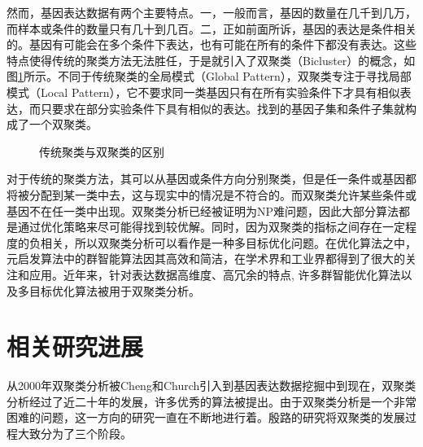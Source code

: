     然而，基因表达数据有两个主要特点。一，一般而言，基因的数量在几千到几万，而样本或条件的数量只有几十到几百。二，正如前面所诉，基因的表达是条件相关的。基因有可能会在多个条件下表达，也有可能在所有的条件下都没有表达。这些特点使得传统的聚类方法无法胜任，于是就引入了双聚类（Bicluster）的概念，如图\ref{fig:tradiAndBi}所示。不同于传统聚类的全局模式（Global Pattern），双聚类专注于寻找局部模式（Local Pattern），它不要求同一类基因只有在所有实验条件下才具有相似表达，而只要求在部分实验条件下具有相似的表达。找到的基因子集和条件子集就构成了一个双聚类。

    \begin{figure}[htbp]
    \setlength{\subfigcapskip}{-1bp}
    \centering
    \begin{minipage}{.9\textwidth}
    \centering
    \subfigure{}\addtocounter{subfigure}{-2}
    \subfigure{\subfigure[基因方向的传统聚类]{\texttt{[image: 1]}}}
    \hspace{.1em}
    \subfigure{}\addtocounter{subfigure}{-2}
    \subfigure{\subfigure[条件方向的传统聚类]{\texttt{[image: 2]}}}
    \hspace{.1em}
    \subfigure{}\addtocounter{subfigure}{-2}
    \subfigure{\subfigure[双聚类]{\texttt{[image: 3]}}}
    \end{minipage}
    \vspace{0.2em}
    \caption{传统聚类与双聚类的区别}
    \label{fig:tradiAndBi}
    \end{figure}
    对于传统的聚类方法，其可以从基因或条件方向分别聚类，但是任一条件或基因都将被分配到某一类中去，这与现实中的情况是不符合的。而双聚类允许某些条件或基因不在任一类中出现。双聚类分析已经被证明为NP难问题，因此大部分算法都是通过优化策略来尽可能得找到较优解。同时，因为双聚类的指标之间存在一定程度的负相关，所以双聚类分析可以看作是一种多目标优化问题。在优化算法之中，元启发算法中的群智能算法因其高效和简洁，在学术界和工业界都得到了很大的关注和应用。近年来，针对表达数据高维度、高冗余的特点, 许多群智能优化算法以及多目标优化算法被用于双聚类分析。

\section{相关研究进展}
    从2000年双聚类分析被Cheng和Church引入到基因表达数据挖掘中到现在，双聚类分析经过了近二十年的发展，许多优秀的算法被提出。由于双聚类分析是一个非常困难的问题，这一方向的研究一直在不断地进行着。殷路\cite{yinlu}的研究将双聚类的发展过程大致分为了三个阶段。

